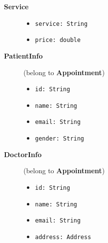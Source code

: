 \begin{description}
	\item[\textbf{Service}]
	\hfill
	\begin{itemize}
		\item \texttt{service: String}  
		\item \texttt{price: double}  
	\end{itemize}
	
	\item[\textbf{PatientInfo}] (belong to \textbf{Appointment})
	\hfill
	\begin{itemize}
		\item \texttt{id: String}  
		\item \texttt{name: String}  
		\item \texttt{email: String}  
		\item \texttt{gender: String}  
	\end{itemize}
	
	\item[\textbf{DoctorInfo}] (belong to \textbf{Appointment})
	\hfill
	\begin{itemize}
		\item \texttt{id: String}  
		\item \texttt{name: String}  
		\item \texttt{email: String}  
		\item \texttt{address: Address}  
	\end{itemize}
\end{description}

